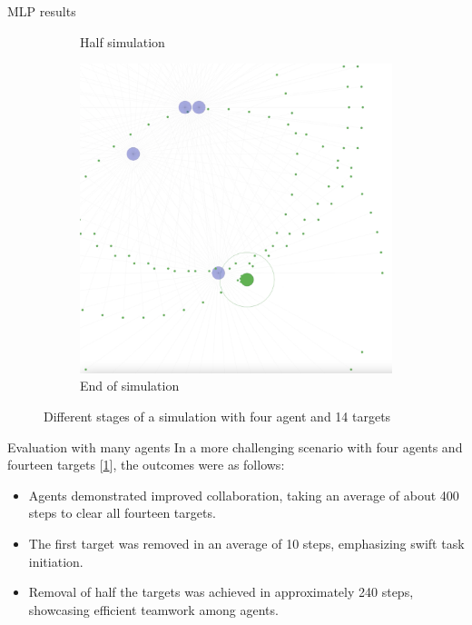 \documentclass[presentation]{beamer}\mode<presentation>{\usetheme{AMSBolognaFC}}
\begin{document}
\begin{frame}[allowframebreaks]{MLP results}
\begin{figure}
\begin{subfigure}[b]{0.45\textwidth}
			\caption{Half simulation}
		\end{subfigure}
		\hfill
		\begin{subfigure}[b]{0.45\textwidth}
			\centering
			\includegraphics[width=\textwidth]{img/4_agents_3.png}
			\caption{End of simulation} 
		\end{subfigure}
		\caption{Different stages of a simulation with four agent and 14 targets}
		\label{fig:n}
	  \end{figure}

	\begin{block}{Evaluation with many agents}
		In a more challenging scenario with four agents and fourteen targets [\ref{fig:n}], the outcomes were as follows:
\begin{itemize}
  \item Agents demonstrated improved collaboration, taking an average of about 400 steps to clear all fourteen targets.
  \item The first target was removed in an average of 10 steps, emphasizing swift task initiation.
  \item Removal of half the targets was achieved in approximately 240 steps, showcasing efficient teamwork among agents.
\end{itemize}
	\end{block}


\end{frame}
\end{document}
